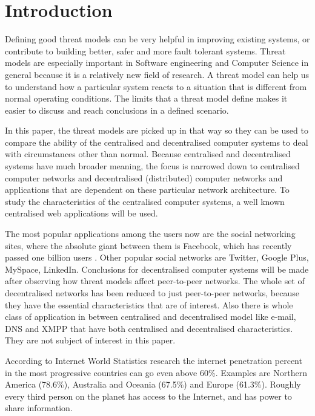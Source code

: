 \section{Introduction}
Defining good threat models can be very helpful in improving existing systems, or contribute to building better, safer and more fault tolerant systems. Threat models are especially important in Software engineering and Computer Science in general because it is a relatively new field of research. A threat model can help us to understand how a particular system reacts to a situation that is different from normal operating conditions. The limits that a threat model define makes it easier to discuss and reach conclusions in a defined scenario.

In this paper, the threat models are picked up in that way so they can be used to compare the ability of the centralised and decentralised computer systems to deal with circumstances other than normal. Because centralised and decentralised systems have much broader meaning, the focus is narrowed down to centralised computer networks and decentralised (distributed) computer networks and applications that are dependent on these particular network architecture. To study the characteristics of the centralised computer systems, a well known centralised web applications will be used. 

The most popular applications among the users now are the social networking sites, where the absolute giant between them is Facebook, which has recently passed one billion users \cite{web:facebookpassesbillion}. Other popular social networks are Twitter, Google Plus, MySpace, LinkedIn. Conclusions for decentralised computer systems will be made after observing how threat models affect peer-to-peer networks. The whole set of decentralised networks has been reduced to just peer-to-peer networks, because they have the essential characteristics that are of interest. Also there is whole class of application in between centralised and decentralised model like e-mail, DNS and XMPP that have both centralised and decentralised characteristics. They are not subject of interest in this paper.

According to Internet World Statistics research \cite{web:internetworldstats} the internet penetration percent in the most progressive countries can go even above 60\%. Examples are Northern America (78.6\%), Australia and Oceania (67.5\%) and Europe (61.3\%). Roughly every third person on the planet has access to the Internet, and has power to share information. 

